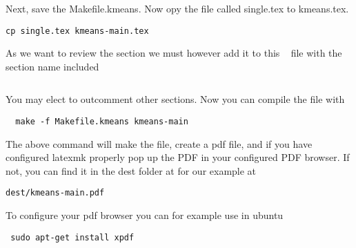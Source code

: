 Next, save the Makefile.kmeans.
Now opy the file called single.tex to kmeans.tex. 

\begin{lstlisting}
cp single.tex kmeans-main.tex
\end{lstlisting}

As we want to review the section we must however  add it to this \LaTex~
file with the section name included

\begin{lstlisting}

\end{lstlisting}

You may elect to outcomment other sections.
Now you can compile the file with 

\begin{lstlisting}
  make -f Makefile.kmeans kmeans-main
\end{lstlisting}


The above command will make the file, create a pdf file, and if you
have configured latexmk properly pop up the PDF in your configured PDF
browser. If not, you can find it in the dest folder at for our example
at 

\begin{lstlisting}
dest/kmeans-main.pdf
\end{lstlisting}


To configure your pdf browser you can for example use in ubuntu

\begin{lstlisting}
 sudo apt-get install xpdf
\end{lstlisting}


